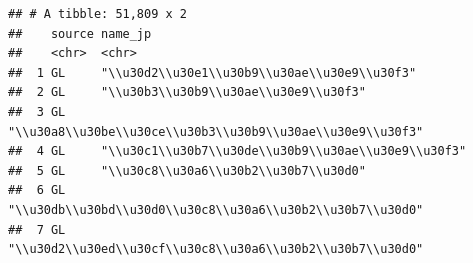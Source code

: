 \documentclass[
  a5paper,
  landscape,
  notitlepage]{report}
\begin{document}
\begin{verbatim}
## # A tibble: 51,809 x 2
##    source name_jp                                                   
##    <chr>  <chr>                                                     
##  1 GL     "\\u30d2\\u30e1\\u30b9\\u30ae\\u30e9\\u30f3"              
##  2 GL     "\\u30b3\\u30b9\\u30ae\\u30e9\\u30f3"                     
##  3 GL     "\\u30a8\\u30be\\u30ce\\u30b3\\u30b9\\u30ae\\u30e9\\u30f3"
##  4 GL     "\\u30c1\\u30b7\\u30de\\u30b9\\u30ae\\u30e9\\u30f3"       
##  5 GL     "\\u30c8\\u30a6\\u30b2\\u30b7\\u30d0"                     
##  6 GL     "\\u30db\\u30bd\\u30d0\\u30c8\\u30a6\\u30b2\\u30b7\\u30d0"
##  7 GL     "\\u30d2\\u30ed\\u30cf\\u30c8\\u30a6\\u30b2\\u30b7\\u30d0"

\end{verbatim}
\end{document}
